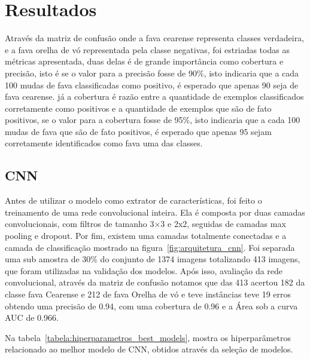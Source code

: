 \section{Resultados}

Através da matriz de confusão onde a fava cearense representa classes verdadeira, e a fava orelha de vó representada pela classe negativas, foi estriadas todas as métricas apresentada, duas delas é de grande importância como cobertura e precisão, isto é se o valor para a precisão fosse de 90\%, isto indicaria que a cada 100 mudas de fava classificadas como positivo, é esperado que apenas 90 seja de fava cearense. já a cobertura é razão entre a quantidade de exemplos classificados corretamente como positivos e a quantidade de exemplos que são de fato positivos, se o valor para a cobertura fosse de 95\%, isto indicaria que a cada 100 mudas de fava que são de fato positivos, é esperado que apenas 95 sejam corretamente identificados como fava uma das classes.  

\subsection{CNN}

Antes de utilizar o modelo como extrator de características, foi feito o treinamento de uma rede convolucional inteira. Ela é composta por duas camadas convolucionais, com filtros de tamanho 3×3 e 2x2, seguidas de camadas max pooling e dropout. Por fim, existem uma camadas totalmente conectadas e a camada de classificação mostrado na figura~\ref{fig:arquitetura_cnn}. Foi separada uma sub amostra de 30\% do conjunto de 1374 imagens totalizando 413 imagens, que foram utilizadas na validação dos modelos. Após isso, avaliação da rede convolucional, através da matriz de confusão notamos que das 413 acertou 182 da classe fava Cearense e 212 de fava Orelha de vó e teve instâncias teve 19 erros obtendo uma precisão de 0.94, com uma cobertura de 0.96 e a Área sob a curva AUC de 0.966.


Na tabela~\ref{tabela:hiperparametros_best_models}, mostra os hiperparâmetros relacionado ao melhor modelo de CNN, obtidos através da seleção de modelos.

